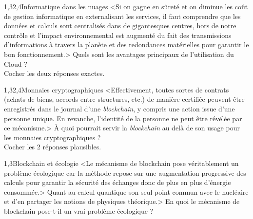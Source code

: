 \begin{quiz}[title={Web et usages}]
\begin{quizquestion}[b]{1,3}{2,4}{Informatique dans les nuages}
<Si on gagne en sûreté et on diminue les coût de gestion informatique en externalisant les services, il faut comprendre que les données et calculs sont centralisés dans de gigantesques centres, hors de notre contrôle et l'impact environnemental est augmenté du fait des transmissions d'informations à travers la planète et des redondances matérielles pour garantir le bon fonctionnement.>
Quels sont les avantages principaux de l'utilisation du Cloud ?\\ Cocher les deux réponses exactes.
\end{quizquestion}

\begin{quizquestion}[c]{1,3}{2,4}{Monnaies cryptographiques}
<Effectivement, toutes sortes de contrats (achats de biens, accords entre structures, etc.) de manière certifiée peuvent être enregistrés dans le journal d'une \textit{blockchain}, y compris une action issue d'une personne unique. En revanche, l'identité de la personne ne peut être révélée par ce mécanisme.>
À quoi pourrait servir la \textit{blockchain} au delà de son usage pour les monnaies cryptographiques ?\\
Cocher les 2 réponses plausibles.
\end{quizquestion}

\begin{quizquestion*}[b]{2}{1,3}{Blockchain et écologie}
<Le mécanisme de blockchain pose véritablement un problème écologique car la méthode repose sur une augmentation progressive des calculs pour garantir la sécurité des échanges donc de plus en plus d'énergie consommée.>%
Quant au calcul quantique son seul point commun avec le nucléaire et d'en partager les notions de physiques théorique.>
En quoi le mécanisme de blockchain pose-t-il un vrai problème écologique ?
\end{quizquestion*}


\end{quiz}
